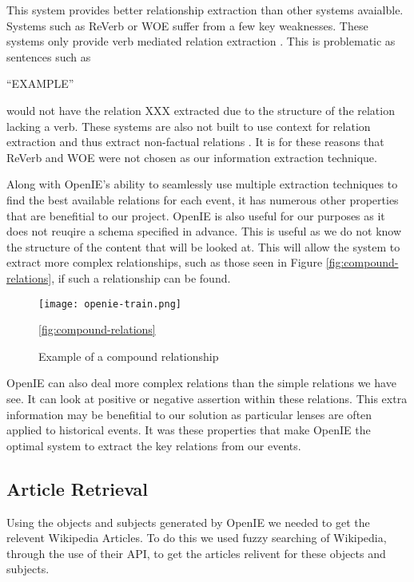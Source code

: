 \documentclass[bsc,frontabs,twoside,singlespacing,parskip,deptreport]{infthesis}     %
\begin{document}
This system provides better relationship extraction than other systems avaialble. Systems such as
ReVerb or WOE suffer from a few key weaknesses. These systems only provide verb mediated relation extraction \cite{schmitz2012open}. This is problematic as sentences such as

``EXAMPLE''

would not have the relation XXX extracted due to the structure of the relation lacking a verb.
These systems are also not built to use context for relation extraction and thus extract non-factual relations \cite{schmitz2012open}.
It is for these reasons that ReVerb and WOE were not chosen as our information extraction technique.


Along with OpenIE's ability to seamlessly use multiple extraction techniques to find the best available
relations for each event, it has numerous other properties that are benefitial to our project.
OpenIE is also useful for our purposes as it does not reuqire a schema specified in advance.
This is useful as we do not know the structure of the content that will be looked at.
This will allow the system to extract
more complex relationships, such as those seen in Figure \ref{fig:compound-relations}, if such
a relationship can be found.


\begin{figure}[h]
  \centering
  \texttt{[image: openie-train.png]}
  \caption{Example of a compound relationship \cite{OpenIE}}
  \ref{fig:compound-relations}
  \end{figure}

OpenIE can also deal more complex relations  than the simple relations we have see.
It can look at positive or negative assertion within these relations.
This extra information may be benefitial to our solution as particular lenses are often applied to historical events.
It was these properties that make OpenIE the optimal system to extract the key relations from our events.


\subsection{Article Retrieval}
Using the objects and subjects generated by OpenIE we needed to get the relevent Wikipedia Articles.
To do this we used fuzzy searching of Wikipedia, through the use of their API, to get the articles relivent
for these objects and subjects.
\end{document}
